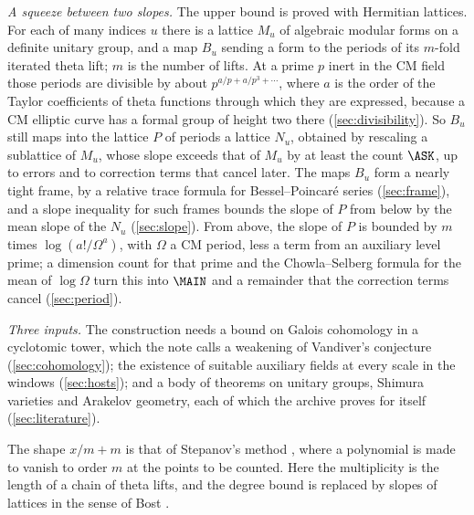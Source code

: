 \emph{A squeeze between two slopes.} The upper bound is proved with Hermitian lattices. For
each of many indices $u$ there is a lattice $M_u$ of algebraic modular forms on a definite
unitary group, and a map $B_u$ sending a form to the periods of its $m$-fold iterated theta
lift; $m$ is the number of lifts. At a prime $p$ inert in the CM field those periods are
divisible by about $p^{a/p+a/p^3+\cdots}$, where $a$ is the order of the Taylor coefficients
of theta functions through which they are expressed, because a CM elliptic curve has a formal
group of height two there (\cref{sec:divisibility}). So $B_u$ still maps into the lattice $P$
of periods a lattice $N_u$, obtained by rescaling a sublattice of $M_u$, whose slope exceeds
that of $M_u$ by at least the count $\ASK$, up to errors and to correction terms that cancel
later. The maps $B_u$ form a nearly tight frame, by a relative trace
formula for Bessel--Poincar\'e series (\cref{sec:frame}), and a slope inequality for such
frames bounds the slope of $P$ from below by the mean slope of the $N_u$ (\cref{sec:slope}).
From above, the slope of $P$ is bounded by $m$ times $\log(a!/\Omega^a)$, with $\Omega$ a
CM period, less a term from an auxiliary level prime; a dimension count for that prime and
the Chowla--Selberg formula for the mean of $\log\Omega$ turn this into $\MAIN$ and a
remainder that the correction terms cancel (\cref{sec:period}).

\emph{Three inputs.} The construction needs a bound on Galois cohomology in a cyclotomic tower,
which the note calls a weakening of Vandiver's conjecture (\cref{sec:cohomology}); the
existence of suitable auxiliary fields at every scale in the windows (\cref{sec:hosts}); and a
body of theorems on unitary groups, Shimura varieties and Arakelov geometry, each of which the
archive proves for itself (\cref{sec:literature}).

The shape $x/m+m$ is that of Stepanov's method \cite{stepanov1969,bombieri1974,schmidt1976equations}, where a
polynomial is made to vanish to order $m$ at the points to be counted. Here the multiplicity is
the length of a chain of theta lifts, and the degree bound is replaced by slopes of lattices in
the sense of Bost \cite{bost1996,bost2001,chambertloir2002theoremes}.

